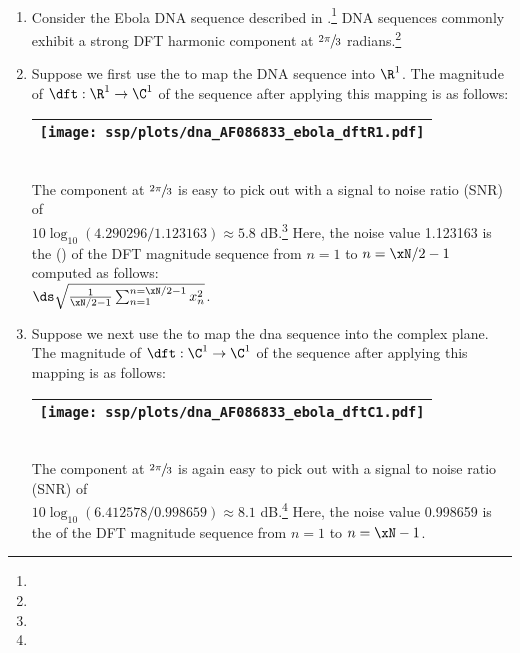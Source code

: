 \begin{example}
\label{ex:dftebola}
\mbox{}\\
\begin{enumerate}
  \item \label{item:dftebola_psp}
     Consider the Ebola DNA sequence described in .\footnote{}
     DNA sequences commonly exhibit a strong DFT harmonic component at $\sfrac{2\pi}{3}$ 
     radians.\footnote{}
  
  \item \label{item:dftebola_R1pam}
    Suppose we first use the   to map
    the DNA sequence into $\R^1$.
    The magnitude of $\dft:\R^1\to\C^1$ of the sequence after applying this mapping is as follows:
    \\\begin{tabular}{|>{\scs}c|}
         \hline
         \texttt{[image: ssp/plots/dna\_AF086833\_ebola\_dftR1.pdf]}%
       \\\hline
    \end{tabular}\\
    The component at $\sfrac{2\pi}{3}$ is easy to pick out with a signal to noise ratio (SNR) of\\ 
    $10\log_{10}(4.290296/1.123163)\approx5.8$ dB.\footnote{}
    Here, the noise value 1.123163 is the  () of the DFT magnitude 
    sequence from $n=1$ to $n=\xN/2-1$ computed as follows:
    \\\indentx$\ds\sqrt{\frac{1}{\xN/2-1}\sum_{n=1}^{n=\xN/2-1} x_n^2}$.
     
  \item \label{item:dftebola_C1qpsk}
    Suppose we next use the   to map
    the dna sequence into the complex plane.
    The magnitude of $\dft:\C^1\to\C^1$ of the sequence after applying this mapping is as follows:
     \\\begin{tabular}{|>{\scs}c|}
          \hline
          \texttt{[image: ssp/plots/dna\_AF086833\_ebola\_dftC1.pdf]}%
        \\\hline
     \end{tabular}\\
    The component at $\sfrac{2\pi}{3}$ is again easy to pick out with a signal to noise ratio (SNR) of\\
    $10\log_{10}(6.412578/0.998659)\approx8.1$ dB.\footnote{}
    Here, the noise value 0.998659 is the  of the DFT magnitude 
    sequence from $n=1$ to $n=\xN-1$.


\end{enumerate}
\end{example}
